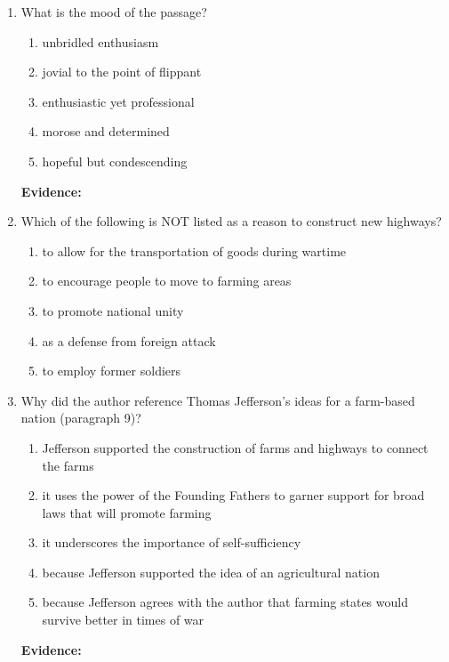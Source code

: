 \bigskip
\begin{enumerate}

\item What is the mood of the passage?

\begin{enumerate}[label=(\Alph*)]
\item unbridled enthusiasm
\item jovial to the point of flippant
\item enthusiastic yet professional
\item morose and determined
\item hopeful but condescending
\end{enumerate}

\bigskip
\textbf{Evidence:} \hrulefill

\bigskip
\item Which of the following is NOT listed as a reason to construct new highways?

\begin{enumerate}[label=(\Alph*)]
\item to allow for the transportation of goods during wartime
\item to encourage people to move to farming areas
\item to promote national unity
\item as a defense from foreign attack
\item to employ former soldiers
\end{enumerate}

\bigskip
\item Why did the author reference Thomas Jefferson's ideas for a farm-based nation (paragraph 9)?

\begin{enumerate}[label=(\Alph*)]
\item Jefferson supported the construction of farms and highways to connect the farms
\item it uses the power of the Founding Fathers to garner support for broad laws that will promote farming
\item it underscores the importance of self-sufficiency
\item because Jefferson supported the idea of an agricultural nation
\item because Jefferson agrees with the author that  farming states would survive better in times of war
\end{enumerate}

\bigskip
\textbf{Evidence:} \hrulefill


\end{enumerate}
